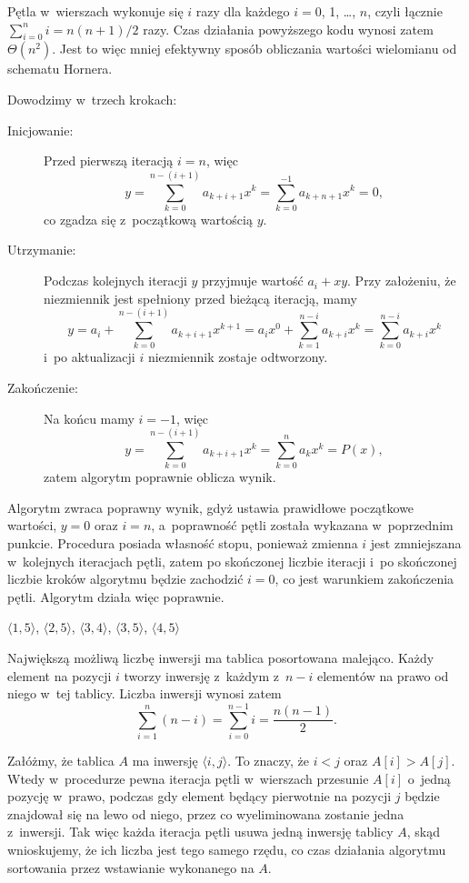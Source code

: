 Pętla  w~wierszach \doubledash{\ref{li:naive-polynomial-evaluation-for-begin}}{\ref{li:naive-polynomial-evaluation-for-end}} wykonuje się $i$ razy dla każdego $i=0$, 1, \dots, $n$, czyli łącznie $\sum_{i=0}^ni=n(n+1)/2$ razy.
Czas działania powyższego kodu wynosi zatem $\Theta(n^2)$.
Jest to więc mniej efektywny sposób obliczania wartości wielomianu od schematu Hornera.

\subproblem %
Dowodzimy w~trzech krokach:
\begin{description}
	\item[Inicjowanie:] Przed pierwszą iteracją $i=n$, więc
	\[
	    y = \sum_{k=0}^{n-(i+1)}a_{k+i+1}x^k = \sum_{k=0}^{-1}a_{k+n+1}x^k = 0,
	\]
	co zgadza się z~początkową wartością $y$.
	\item[Utrzymanie:] Podczas kolejnych iteracji $y$ przyjmuje wartość $a_i+xy$.
Przy założeniu, że niezmiennik jest spełniony przed bieżącą iteracją, mamy
	\[
		y = a_i+\sum_{k=0}^{n-(i+1)}a_{k+i+1}x^{k+1} = a_ix^0+\sum_{k=1}^{n-i}a_{k+i}x^k = \sum_{k=0}^{n-i}a_{k+i}x^k
	\]
	i~po aktualizacji $i$ niezmiennik zostaje odtworzony.
	\item[Zakończenie:] Na końcu mamy $i=-1$, więc
	\[
		y = \sum_{k=0}^{n-(i+1)}a_{k+i+1}x^k = \sum_{k=0}^na_kx^k = P(x),
	\]
	zatem algorytm poprawnie oblicza wynik.
\end{description}

\subproblem %
Algorytm zwraca poprawny wynik, gdyż ustawia prawidłowe początkowe wartości, $y=0$ oraz $i=n$, a~poprawność pętli  została wykazana w~poprzednim punkcie.
Procedura posiada własność stopu, ponieważ zmienna $i$ jest zmniejszana w~kolejnych iteracjach pętli, zatem po skończonej liczbie iteracji i~po skończonej liczbie kroków algorytmu będzie zachodzić $i=0$, co jest warunkiem zakończenia pętli.
Algorytm działa więc poprawnie.


\subproblem %
$\langle1,5\rangle$, $\langle2,5\rangle$, $\langle3,4\rangle$, $\langle3,5\rangle$, $\langle4,5\rangle$

\subproblem %
Największą możliwą liczbę inwersji ma tablica posortowana malejąco.
Każdy element na pozycji $i$ tworzy inwersję z~każdym z~$n-i$ elementów na prawo od niego w~tej tablicy.
Liczba inwersji wynosi zatem
\[
	\sum_{i=1}^n(n-i) = \sum_{i=0}^{n-1}i = \frac{n(n-1)}{2}.
\]

\subproblem %
Załóżmy, że tablica $A$ ma inwersję $\langle i,j\rangle$.
To znaczy, że $i<j$ oraz $A[i]>A[j]$.
Wtedy w~procedurze  pewna iteracja pętli  w~wierszach  przesunie $A[i]$ o~jedną pozycję w~prawo, podczas gdy element będący pierwotnie na pozycji $j$ będzie znajdował się na lewo od niego, przez co wyeliminowana zostanie jedna z~inwersji.
Tak więc każda iteracja pętli  usuwa jedną inwersję tablicy $A$, skąd wnioskujemy, że ich liczba jest tego samego rzędu, co czas działania algorytmu sortowania przez wstawianie wykonanego na $A$.


